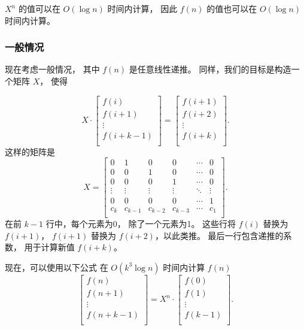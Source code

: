 $X^n$ 的值可以在
$O(\log n)$ 时间内计算，
因此 $f(n)$ 的值也可以在
$O(\log n)$ 时间内计算。

\subsubsection{一般情况}

现在考虑一般情况，
其中 $f(n)$ 是任意线性递推。
同样，我们的目标是构造一个矩阵 $X$，
使得

\[ X \cdot
 \begin{bmatrix}
  f(i) \\
  f(i+1) \\
  \vdots \\
  f(i+k-1) \\
 \end{bmatrix}
=
 \begin{bmatrix}
  f(i+1) \\
  f(i+2) \\
  \vdots \\
  f(i+k) \\
 \end{bmatrix}.
\]
这样的矩阵是
\[
X =
 \begin{bmatrix}
  0 & 1 & 0 & 0 & \cdots & 0 \\
  0 & 0 & 1 & 0 & \cdots & 0 \\
  0 & 0 & 0 & 1 & \cdots & 0 \\
  \vdots & \vdots & \vdots & \vdots & \ddots & \vdots \\
  0 & 0 & 0 & 0 & \cdots & 1 \\
  c_k & c_{k-1} & c_{k-2} & c_{k-3} & \cdots & c_1 \\
 \end{bmatrix}.
\]
在前 $k-1$ 行中，每个元素为0，
除了一个元素为1。
这些行将 $f(i)$ 替换为 $f(i+1)$，
$f(i+1)$ 替换为 $f(i+2)$，以此类推。
最后一行包含递推的系数，
用于计算新值 $f(i+k)$。

\begin{samepage}
现在，可以使用以下公式
在 $O(k^3 \log n)$ 时间内计算 $f(n)$
\[
 \begin{bmatrix}
  f(n) \\
  f(n+1) \\
  \vdots \\
  f(n+k-1) \\
 \end{bmatrix}
=
X^n \cdot
 \begin{bmatrix}
  f(0) \\
  f(1) \\
  \vdots \\
  f(k-1) \\
 \end{bmatrix}.
\]
\end{samepage}


